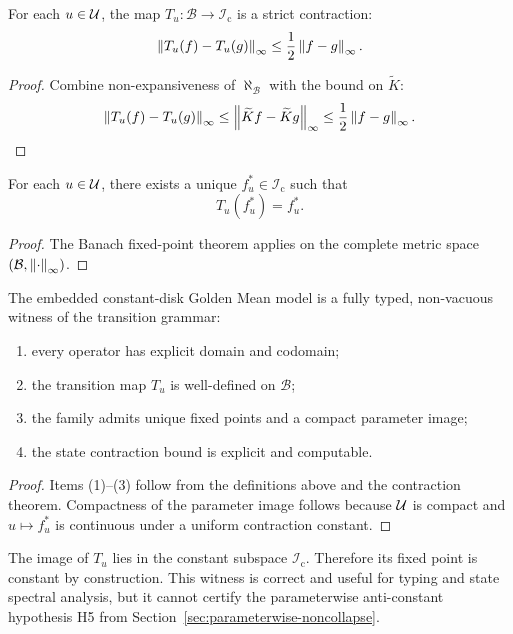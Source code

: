 \begin{theorem}
For each $u\in\mathcal{U}$, the map $T_u:\mathcal{B}\to\mathcal{I}_{\mathrm c}$ is a strict contraction:
\[
\left\lVert T_u(f)-T_u(g) \right\rVert_\infty\le \frac{1}{2}\left\lVert f-g \right\rVert_\infty.
\]
\end{theorem}

\begin{proof}
Combine non-expansiveness of $\aleph_{\mathcal B}$ with the bound on $\widetilde K$:
\[
\left\lVert T_u(f)-T_u(g) \right\rVert_\infty
\le
\left\lVert \widetilde K f-\widetilde K g \right\rVert_\infty
\le
\frac{1}{2}\left\lVert f-g \right\rVert_\infty.
\]
\end{proof}

\begin{corollary}
For each $u\in\mathcal{U}$, there exists a unique $f_u^\ast\in\mathcal{I}_{\mathrm c}$ such that
\[
T_u(f_u^\ast)=f_u^\ast.
\]
\end{corollary}

\begin{proof}
The Banach fixed-point theorem applies on the complete metric space $(\mathcal{B},\left\lVert \cdot \right\rVert_\infty)$.
\end{proof}

\begin{proposition}\label{prop:Q3verify}
The embedded constant-disk Golden Mean model is a fully typed, non-vacuous witness of the transition grammar:
\begin{enumerate}[leftmargin=*]
\item every operator has explicit domain and codomain;
\item the transition map $T_u$ is well-defined on $\mathcal{B}$;
\item the family admits unique fixed points and a compact parameter image;
\item the state contraction bound is explicit and computable.
\end{enumerate}
\end{proposition}

\begin{proof}
Items (1)--(3) follow from the definitions above and the contraction theorem. Compactness of the parameter image follows because $\mathcal{U}$ is compact and $u\mapsto f_u^\ast$ is continuous under a uniform contraction constant.
\end{proof}

\begin{remark}
The image of $T_u$ lies in the constant subspace $\mathcal{I}_{\mathrm c}$. Therefore its fixed point is constant by construction. This witness is correct and useful for typing and state spectral analysis, but it cannot certify the parameterwise anti-constant hypothesis H5 from Section~\ref{sec:parameterwise-noncollapse}.
\end{remark}

